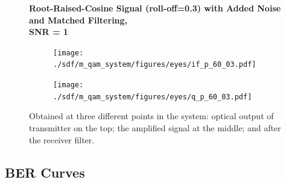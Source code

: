 \begin{figure}[H]
		\centering
	\textbf{Root-Raised-Cosine Signal (roll-off=0.3) with Added Noise and Matched Filtering,\\ SNR = 1}
	\begin{minipage}{\linewidth}
		\centering
	\begin{subfigure}{.45\textwidth}
		\centering
		\texttt{[image: ./sdf/m\_qam\_system/figures/eyes/if\_p\_60\_03.pdf]}
	\end{subfigure}
	\begin{subfigure}{.45\textwidth}
		\centering
		\texttt{[image: ./sdf/m\_qam\_system/figures/eyes/q\_p\_60\_03.pdf]}
	\end{subfigure}
	
	\caption{
		Obtained at three different points in the system: optical output of transmitter on the top;
		the amplified signal at the middle; and
		after the receiver filter.
		\label{fig:eyes_n_rc_60_03}}
	\end{minipage}
\end{figure}



\subsection{BER Curves}

